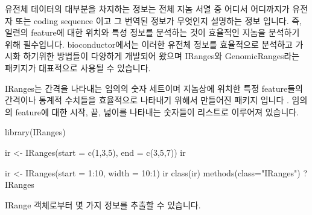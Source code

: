 \documentclass[
]{book}
\newenvironment{Shaded}{\begin{snugshade}}{\end{snugshade}}
\newcommand{\AttributeTok}[1]{\textcolor[rgb]{0.77,0.63,0.00}{#1}}
\newcommand{\DecValTok}[1]{\textcolor[rgb]{0.00,0.00,0.81}{#1}}
\newcommand{\FunctionTok}[1]{\textcolor[rgb]{0.00,0.00,0.00}{#1}}
\newcommand{\NormalTok}[1]{#1}
\newcommand{\OtherTok}[1]{\textcolor[rgb]{0.56,0.35,0.01}{#1}}
\newcommand{\SpecialCharTok}[1]{\textcolor[rgb]{0.00,0.00,0.00}{#1}}
\newcommand{\StringTok}[1]{\textcolor[rgb]{0.31,0.60,0.02}{#1}}
\begin{document}
유전체 데이터의 대부분을 차지하는 정보는 전체 지놈 서열 중 어디서 어디까지가 유전자 또는 coding sequence 이고 그 번역된 정보가 무엇인지 설명하는 정보 입니다. 즉, 일련의 feature에 대한 위치와 특성 정보를 분석하는 것이 효율적인 지놈을 분석하기 위해 필수입니다. bioconductor에서는 이러한 유전체 정보를 효율적으로 분석하고 가시화 하기위한 방법들이 다양하게 개발되어 왔으며 IRanges와 GenomicRanges라는 패키지가 대표적으로 사용될 수 있습니다.

IRanges는 간격을 나타내는 임의의 숫자 세트이며 지놈상에 위치한 특정 feature들의 간격이나 통계적 수치들을 효율적으로 나타내기 위해서 만들어진 패키지 입니다 \citep{Lawrence2013}. 임의의 feature에 대한 시작, 끝, 넓이를 나타내는 숫자들이 리스트로 이루어져 있습니다.

\begin{Shaded}
\begin{Highlighting}[]
\FunctionTok{library}\NormalTok{(IRanges)}

\NormalTok{ir }\OtherTok{\textless{}{-}} \FunctionTok{IRanges}\NormalTok{(}\AttributeTok{start =} \FunctionTok{c}\NormalTok{(}\DecValTok{1}\NormalTok{,}\DecValTok{3}\NormalTok{,}\DecValTok{5}\NormalTok{), }\AttributeTok{end =} \FunctionTok{c}\NormalTok{(}\DecValTok{3}\NormalTok{,}\DecValTok{5}\NormalTok{,}\DecValTok{7}\NormalTok{))}
\NormalTok{ir}

\NormalTok{ir }\OtherTok{\textless{}{-}} \FunctionTok{IRanges}\NormalTok{(}\AttributeTok{start =} \DecValTok{1}\SpecialCharTok{:}\DecValTok{10}\NormalTok{, }\AttributeTok{width =} \DecValTok{10}\SpecialCharTok{:}\DecValTok{1}\NormalTok{)}
\NormalTok{ir}
\FunctionTok{class}\NormalTok{(ir)}
\FunctionTok{methods}\NormalTok{(}\AttributeTok{class=}\StringTok{"IRanges"}\NormalTok{)}
\NormalTok{?IRanges}
\end{Highlighting}
\end{Shaded}

IRange 객체로부터 몇 가지 정보를 추출할 수 있습니다.
\end{document}
